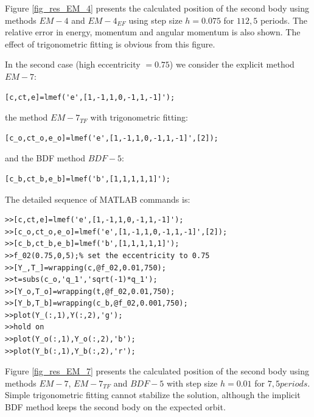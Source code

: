\documentclass[acmtoms,acmnow]{acmtrans2m}
\begin{document}
Figure \ref{fig_res_EM_4} presents the calculated position of the second body using methods $EM-4$ and $EM-4_{EF}$ using step size $h=0.075$ for $112,5$ periods. The relative error in energy, momentum and angular momentum is also shown. The effect of trigonometric fitting is obvious from this figure.

In the second case (high eccentricity $=0.75$) we consider the explicit method $EM-7$:
\begin{verbatim}
[c,ct,e]=lmef('e',[1,-1,1,0,-1,1,-1]');
\end{verbatim}
the method $EM-7_{TF}$ with trigonometric fitting:
\begin{verbatim}
[c_o,ct_o,e_o]=lmef('e',[1,-1,1,0,-1,1,-1]',[2]);
\end{verbatim}
and the BDF method $BDF-5$:
\begin{verbatim}
[c_b,ct_b,e_b]=lmef('b',[1,1,1,1,1]');
\end{verbatim}
The detailed sequence of MATLAB commands is:
\begin{verbatim}
>>[c,ct,e]=lmef('e',[1,-1,1,0,-1,1,-1]');
>>[c_o,ct_o,e_o]=lmef('e',[1,-1,1,0,-1,1,-1]',[2]);
>>[c_b,ct_b,e_b]=lmef('b',[1,1,1,1,1]');
>>f_02(0.75,0,5);% set the eccentricity to 0.75
>>[Y_,T_]=wrapping(c,@f_02,0.01,750);
>>t=subs(c_o,'q_1','sqrt(-1)*q_1');
>>[Y_o,T_o]=wrapping(t,@f_02,0.01,750);
>>[Y_b,T_b]=wrapping(c_b,@f_02,0.001,750);
>>plot(Y_(:,1),Y(:,2),'g');
>>hold on
>>plot(Y_o(:,1),Y_o(:,2),'b');
>>plot(Y_b(:,1),Y_b(:,2),'r');
\end{verbatim}

Figure \ref{fig_res_EM_7} presents the calculated position of the second body using methods $EM-7$, $EM-7_{TF}$ and $BDF-5$ with step size $h=0.01$ for $7,5 periods$. Simple trigonometric fitting cannot stabilize the solution, although the implicit BDF method keeps the second body on the expected orbit.
\end{document}
